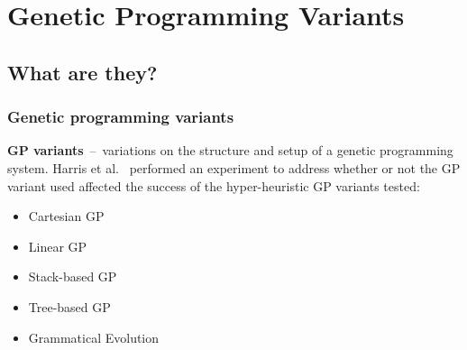 \documentclass{beamer}
\newcommand{\linespace}{\vskip 0.25cm}
\begin{document}
\section[GP Variants]{Genetic Programming Variants}

\subsection{What are they?}

\begin{frame}
	\frametitle{Genetic programming variants}
	\textbf{GP variants}~--~variations on the structure and setup of a genetic programming system.
	\linespace
	\pause
	Harris et al.~\cite{harris:2015} performed an experiment to address whether or not the GP variant used affected the success of the hyper-heuristic
	\linespace
	\pause
	GP variants tested:
	\begin{itemize}
		\item Cartesian GP
		\item Linear GP
		\item Stack-based GP
		\item Tree-based GP
		\item Grammatical Evolution
	\end{itemize}
\end{frame}
\end{document}
